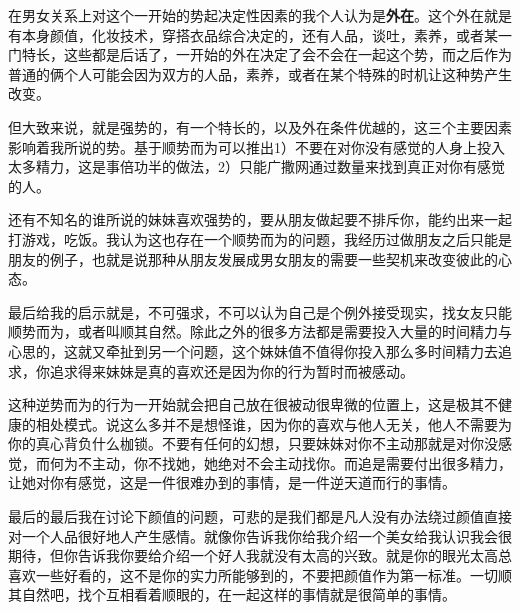 \documentclass{article}
\begin{document}
在男女关系上对这个一开始的势起决定性因素的我个人认为是\textbf{外在}。这个外在就是有本身颜值，化妆技术，穿搭衣品综合决定的，还有人品，谈吐，素养，或者某一门特长，这些都是后话了，一开始的外在决定了会不会在一起这个势，而之后作为普通的俩个人可能会因为双方的人品，素养，或者在某个特殊的时机让这种势产生改变。

但大致来说，就是强势的，有一个特长的，以及外在条件优越的，这三个主要因素影响着我所说的势。基于顺势而为可以推出1）不要在对你没有感觉的人身上投入太多精力，这是事倍功半的做法，2）只能广撒网通过数量来找到真正对你有感觉的人。

还有不知名的谁所说的妹妹喜欢强势的，要从朋友做起要不排斥你，能约出来一起打游戏，吃饭。我认为这也存在一个顺势而为的问题，我经历过做朋友之后只能是朋友的例子，也就是说那种从朋友发展成男女朋友的需要一些契机来改变彼此的心态。
  
最后给我的启示就是，不可强求，不可以认为自己是个例外接受现实，找女友只能顺势而为，或者叫顺其自然。除此之外的很多方法都是需要投入大量的时间精力与心思的，这就又牵扯到另一个问题，这个妹妹值不值得你投入那么多时间精力去追求，你追求得来妹妹是真的喜欢还是因为你的行为暂时而被感动。

这种逆势而为的行为一开始就会把自己放在很被动很卑微的位置上，这是极其不健康的相处模式。说这么多并不是想怪谁，因为你的喜欢与他人无关，他人不需要为你的真心背负什么枷锁。不要有任何的幻想，只要妹妹对你不主动那就是对你没感觉，而何为不主动，你不找她，她绝对不会主动找你。而追是需要付出很多精力，让她对你有感觉，这是一件很难办到的事情，是一件逆天道而行的事情。

最后的最后我在讨论下颜值的问题，可悲的是我们都是凡人没有办法绕过颜值直接对一个人品很好地人产生感情。就像你告诉我你给我介绍一个美女给我认识我会很期待，但你告诉我你要给介绍一个好人我就没有太高的兴致。就是你的眼光太高总喜欢一些好看的，这不是你的实力所能够到的，不要把颜值作为第一标准。一切顺其自然吧，找个互相看着顺眼的，在一起这样的事情就是很简单的事情。
\end{document}
